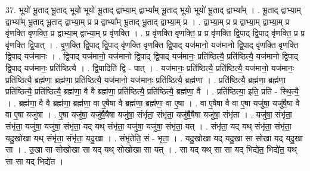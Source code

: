 \documentclass[17pt]{extarticle}
\begin{document}
37. भूयो॑ भू॒ताद् भू॒ताद् भूयो॒ भूयो॑ भू॒ताद् द्वाभ्या॒म् द्वाभ्या᳚म् भू॒ताद् भूयो॒ भूयो॑ भू॒ताद् द्वाभ्या᳚म् । . भू॒ताद् द्वाभ्या॒म् द्वाभ्या᳚म् भू॒ताद् भू॒ताद् द्वाभ्या॒म् प्र प्र द्वाभ्या᳚म् भू॒ताद् भू॒ताद् द्वाभ्या॒म् प्र । . द्वाभ्या॒म् प्र प्र द्वाभ्या॒म् द्वाभ्या॒म् प्र वृ॑णक्ति वृणक्ति॒ प्र द्वाभ्या॒म् द्वाभ्या॒म् प्र वृ॑णक्ति । . प्र वृ॑णक्ति वृणक्ति॒ प्र प्र वृ॑णक्ति द्वि॒पाद् द्वि॒पाद् वृ॑णक्ति॒ प्र प्र वृ॑णक्ति द्वि॒पात् । . वृ॒ण॒क्ति॒ द्वि॒पाद् द्वि॒पाद् वृ॑णक्ति वृणक्ति द्वि॒पाद् यज॑मानो॒ यज॑मानो द्वि॒पाद् वृ॑णक्ति वृणक्ति द्वि॒पाद् यज॑मानः । . द्वि॒पाद् यज॑मानो॒ यज॑मानो द्वि॒पाद् द्वि॒पाद् यज॑मानः॒ प्रति॑ष्ठित्यै॒ प्रति॑ष्ठित्यै॒ यज॑मानो द्वि॒पाद् द्वि॒पाद् यज॑मानः॒ प्रति॑ष्ठित्यै । . द्वि॒पादिति॑ द्वि - पात् । . यज॑मानः॒ प्रति॑ष्ठित्यै॒ प्रति॑ष्ठित्यै॒ यज॑मानो॒ यज॑मानः॒ प्रति॑ष्ठित्यै॒ ब्रह्म॑णा॒ ब्रह्म॑णा॒ प्रति॑ष्ठित्यै॒ यज॑मानो॒ यज॑मानः॒ प्रति॑ष्ठित्यै॒ ब्रह्म॑णा । . प्रति॑ष्ठित्यै॒ ब्रह्म॑णा॒ ब्रह्म॑णा॒ प्रति॑ष्ठित्यै॒ प्रति॑ष्ठित्यै॒ ब्रह्म॑णा॒ वै वै ब्रह्म॑णा॒ प्रति॑ष्ठित्यै॒ प्रति॑ष्ठित्यै॒ ब्रह्म॑णा॒ वै । . प्रति॑ष्ठित्या॒ इति॒ प्रति॑ - स्थि॒त्यै॒ । . ब्रह्म॑णा॒ वै वै ब्रह्म॑णा॒ ब्रह्म॑णा॒ वा ए॒षैषा वै ब्रह्म॑णा॒ ब्रह्म॑णा॒ वा ए॒षा । . वा ए॒षैषा वै वा ए॒षा यजु॑षा॒ यजु॑षै॒षा वै वा ए॒षा यजु॑षा । . ए॒षा यजु॑षा॒ यजु॑षै॒षैषा यजु॑षा॒ संभृ॑ता॒ संभृ॑ता॒ यजु॑षै॒षैषा यजु॑षा॒ संभृ॑ता । . यजु॑षा॒ संभृ॑ता॒ संभृ॑ता॒ यजु॑षा॒ यजु॑षा॒ संभृ॑ता॒ यद् यथ् संभृ॑ता॒ यजु॑षा॒ यजु॑षा॒ संभृ॑ता॒ यत् । . संभृ॑ता॒ यद् यथ् संभृ॑ता॒ संभृ॑ता॒ यदु॒खोखा यथ् संभृ॑ता॒ संभृ॑ता॒ यदु॒खा । . संभृ॒तेति॒ सं - भृ॒ता॒ । . यदु॒खोखा यद् यदु॒खा सा सोखा यद् यदु॒खा सा । . उ॒खा सा सोखोखा सा यद् यथ् सोखोखा सा यत् । . सा यद् यथ् सा सा यद् भिद्ये॑त॒ भिद्ये॑त॒ यथ् सा सा यद् भिद्ये॑त । \newline
\end{document}
